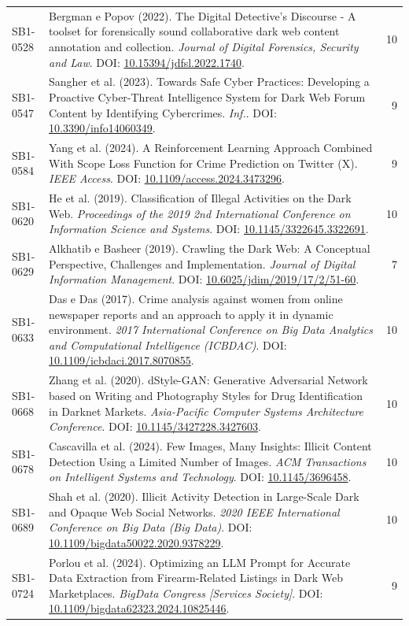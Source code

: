 \begin{small}
\begin{longtable}{lp{11.2cm}r}
SB1-0528 & Bergman e Popov (2022). The Digital Detective's Discourse - A toolset for forensically sound collaborative dark web content annotation and collection. \textit{Journal of Digital Forensics, Security and Law}. DOI: \url{10.15394/jdfsl.2022.1740}. & 10 \\
SB1-0547 & Sangher et al. (2023). Towards Safe Cyber Practices: Developing a Proactive Cyber-Threat Intelligence System for Dark Web Forum Content by Identifying Cybercrimes. \textit{Inf.}. DOI: \url{10.3390/info14060349}. & 9 \\
SB1-0584 & Yang et al. (2024). A Reinforcement Learning Approach Combined With Scope Loss Function for Crime Prediction on Twitter (X). \textit{IEEE Access}. DOI: \url{10.1109/access.2024.3473296}. & 9 \\
SB1-0620 & He et al. (2019). Classification of Illegal Activities on the Dark Web. \textit{Proceedings of the 2019 2nd International Conference on Information Science and Systems}. DOI: \url{10.1145/3322645.3322691}. & 10 \\
SB1-0629 & Alkhatib e Basheer (2019). Crawling the Dark Web: A Conceptual Perspective, Challenges and Implementation. \textit{Journal of Digital Information Management}. DOI: \url{10.6025/jdim/2019/17/2/51-60}. & 7 \\
SB1-0633 & Das e Das (2017). Crime analysis against women from online newspaper reports and an approach to apply it in dynamic environment. \textit{2017 International Conference on Big Data Analytics and Computational Intelligence (ICBDAC)}. DOI: \url{10.1109/icbdaci.2017.8070855}. & 10 \\
SB1-0668 & Zhang et al. (2020). dStyle-GAN: Generative Adversarial Network based on Writing and Photography Styles for Drug Identification in Darknet Markets. \textit{Asia-Pacific Computer Systems Architecture Conference}. DOI: \url{10.1145/3427228.3427603}. & 10 \\
SB1-0678 & Cascavilla et al. (2024). Few Images, Many Insights: Illicit Content Detection Using a Limited Number of Images. \textit{ACM Transactions on Intelligent Systems and Technology}. DOI: \url{10.1145/3696458}. & 10 \\
SB1-0689 & Shah et al. (2020). Illicit Activity Detection in Large-Scale Dark and Opaque Web Social Networks. \textit{2020 IEEE International Conference on Big Data (Big Data)}. DOI: \url{10.1109/bigdata50022.2020.9378229}. & 10 \\
SB1-0724 & Porlou et al. (2024). Optimizing an LLM Prompt for Accurate Data Extraction from Firearm-Related Listings in Dark Web Marketplaces. \textit{BigData Congress [Services Society]}. DOI: \url{10.1109/bigdata62323.2024.10825446}. & 9 \\

\end{longtable}
\end{small}
